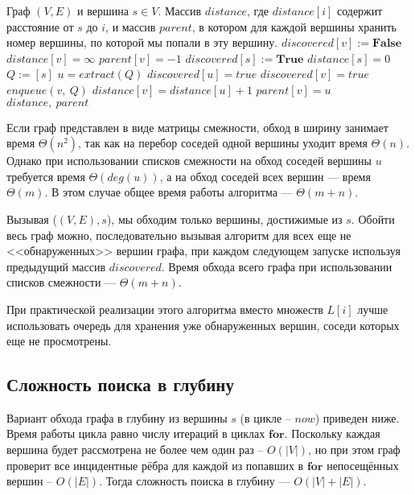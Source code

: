 \documentclass[a4paper,12pt]{article}
\begin{document}
\begin{algorithm}
  	\caption{($(V, E), s$)}
    \begin{algorithmic}
		\Require Граф $(V, E)$ и вершина $s \in V$.
		\Ensure Массив $distance$, где $distance[i]$ содержит расстояние от $s$ до $i$, и массив $parent$, в котором для каждой вершины хранить номер вершины, по которой мы попали в эту вершину.
			\State $discovered[v] := \textbf{False}$
			\State $distance[v] = \infty$
			\State $parent[v] = -1$
		\EndFor
		\State $discovered[s] := \textbf{True}$
		\State $distance[s] = 0$
        \State $Q := [s]$
            \State $u = extract(Q)$
            \State $discovered[u] = true$
                    \State $discovered[v] = true$
                    \State $enqueue(v,\ Q)$
                    \State $distance[v] = distance[u] + 1$
                    \State $parent[v] = u$
                \EndIf
            \EndFor
        \EndWhile
		\State
		\Return $distance,\ parent$
	\end{algorithmic}
\end{algorithm}

Если граф представлен в виде матрицы смежности, обход в ширину занимает время $\Theta(n^2)$, так как на перебор соседей одной вершины уходит время $\Theta(n)$. Однако при использовании списков смежности на обход соседей вершины $u$ требуется время $\Theta(deg(u))$, а на обход соседей всех вершин --- время $\Theta(m)$. В этом случае общее время работы алгоритма --- $\Theta(m + n)$. 


Вызывая ($(V, E), s$), мы обходим только вершины, достижимые из $s$. Обойти весь граф можно, последовательно вызывая алгоритм для всех еще не <<обнаруженных>> вершин графа, при каждом следующем запуске используя предыдущий массив $discovered$. Время обхода всего графа при использовании списков смежности --- $\Theta(m + n)$.

При практической реализации этого алгоритма вместо множеств $L[i]$ лучше использовать очередь для хранения уже обнаруженных вершин, соседи которых еще не просмотрены.

\subsection{Сложность поиска в глубину}
Вариант обхода графа в глубину из вершины $s$ (в цикле -- $now$) приведен ниже. Время работы цикла равно числу итераций в циклах $\textbf{for}$. Поскольку каждая вершина будет рассмотрена не более чем один раз -- $O(|V|)$, но при этом граф проверит все инцидентные рёбра для каждой из попавших в $\textbf{for}$ непосещённых вершин -- $O(|E|)$. Тогда сложность поиска в глубину --- $O(|V| + |E|)$.
\end{document}
